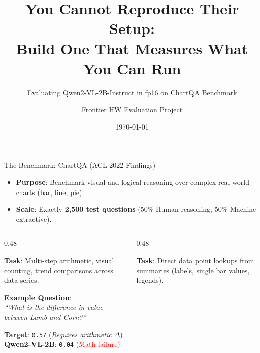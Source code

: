 \documentclass[aspectratio=169, 10pt]{beamer}
\title[Assessing Small VLMs on ChartQA]{You Cannot Reproduce Their Setup:\\Build One That Measures What You Can Run}
\subtitle{Evaluating Qwen2-VL-2B-Instruct in fp16 on ChartQA Benchmark}
\author{Frontier HW Evaluation Project}
\institute{Class Project $\cdot$ One Term $\cdot$ One V100 Profile}
\date{\today}
\begin{document}
\begin{frame}
    \titlepage
\end{frame}

\begin{frame}{The Benchmark: ChartQA (ACL 2022 Findings)}
    \begin{itemize}
        \item \textbf{Purpose}: Benchmark visual and logical reasoning over complex real-world charts (bar, line, pie).
        \item \textbf{Scale}: Exactly \textbf{2,500 test questions} (50\% Human reasoning, 50\% Machine extractive).
    \end{itemize}

    \vspace{0.2cm}
    \begin{columns}[T]
        \begin{column}{0.48\textwidth}
            \begin{tcolorbox}[colframe=primary, title=\textbf{ChartQA-H (Human Reasoning)}]
                \small
                \textbf{Task}: Multi-step arithmetic, visual counting, trend comparisons across data series.
                \vspace{0.15cm}
                
                \textbf{Example Question}:\\
                \textit{``What is the difference in value between Lamb and Corn?''}
                \vspace{0.1cm}
                
                \textbf{Target}: \texttt{0.57} \quad (\textit{Requires arithmetic $\Delta$})\\
                \textbf{Qwen2-VL-2B}: \texttt{0.04} \quad \textcolor{red}{ (Math failure)}
            \end{tcolorbox}
        \end{column}

        \begin{column}{0.48\textwidth}
            \begin{tcolorbox}[colframe=secondary, title=\textbf{ChartQA-M (Machine Extractive)}]
                \small
                \textbf{Task}: Direct data point lookups from summaries (labels, single bar values, legends).
                \vspace{0.15cm}
                

\end{tcolorbox}
\end{column}
\end{columns}
\end{frame}
\end{document}
